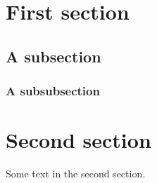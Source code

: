 \documentclass{article}
\begin{document}
\tableofcontents
\section{First section}
\subsection{A subsection}
\subsubsection{A subsubsection}
\section{Second section}
Some text in the second section.
\end{document}

